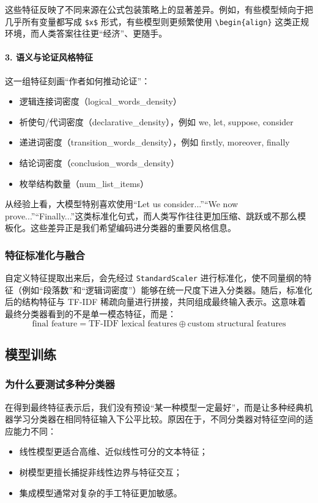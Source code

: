 \documentclass[11pt, a4paper]{ctexart}
\begin{document}
这些特征反映了不同来源在公式包装策略上的显著差异。例如，有些模型倾向于把几乎所有变量都写成 \verb|$x$| 形式，有些模型则更频繁使用 \verb|\begin{align}| 这类正规环境，而人类答案往往更“经济”、更随手。

\paragraph{3. 语义与论证风格特征}
这一组特征刻画“作者如何推动论证”：
\begin{itemize}
    \item 逻辑连接词密度（logical\_words\_density）
    \item 祈使句/代词密度（declarative\_density），例如 we, let, suppose, consider
    \item 递进词密度（transition\_words\_density），例如 firstly, moreover, finally
    \item 结论词密度（conclusion\_words\_density）
    \item 枚举结构数量（num\_list\_items）
\end{itemize}

从经验上看，大模型特别喜欢使用“Let us consider...”“We now prove...”“Finally...”这类标准化句式，而人类写作往往更加压缩、跳跃或不那么模板化。这些差异正是我们希望编码进分类器的重要风格信息。

\subsubsection{特征标准化与融合}
自定义特征提取出来后，会先经过 \texttt{StandardScaler} 进行标准化，使不同量纲的特征（例如“段落数”和“逻辑词密度”）能够在统一尺度下进入分类器。随后，标准化后的结构特征与 TF-IDF 稀疏向量进行拼接，共同组成最终输入表示。这意味着最终分类器看到的不是单一模态特征，而是：
\[
\text{final feature} = \text{TF-IDF lexical features} \oplus \text{custom structural features}
\]

\subsection{模型训练}

\subsubsection{为什么要测试多种分类器}
在得到最终特征表示后，我们没有预设“某一种模型一定最好”，而是让多种经典机器学习分类器在相同特征输入下公平比较。原因在于，不同分类器对特征空间的适应能力不同：
\begin{itemize}
    \item 线性模型更适合高维、近似线性可分的文本特征；
    \item 树模型更擅长捕捉非线性边界与特征交互；
    \item 集成模型通常对复杂的手工特征更加敏感。
\end{itemize}
\end{document}
